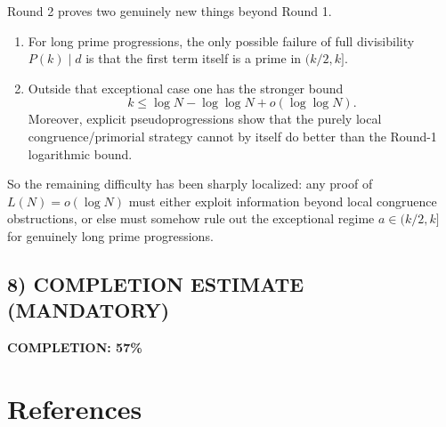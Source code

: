 Round 2 proves two genuinely new things beyond Round 1.
\begin{enumerate}
\item For long prime progressions, the only possible failure of full divisibility $P(k)\mid d$ is that the first term itself is a prime in $(k/2,k]$.
\item Outside that exceptional case one has the stronger bound
\[
k\le \log N-\log\log N+o(\log\log N).
\]
Moreover, explicit pseudoprogressions show that the purely local congruence/primorial strategy cannot by itself do better than the Round-1 logarithmic bound.
\end{enumerate}
So the remaining difficulty has been sharply localized: any proof of $L(N)=o(\log N)$ must either exploit information beyond local congruence obstructions, or else must somehow rule out the exceptional regime $a\in (k/2,k]$ for genuinely long prime progressions.

\subsection*{8) COMPLETION ESTIMATE (MANDATORY)}
\textbf{COMPLETION: 57\%}

\bigskip
\section*{References}

